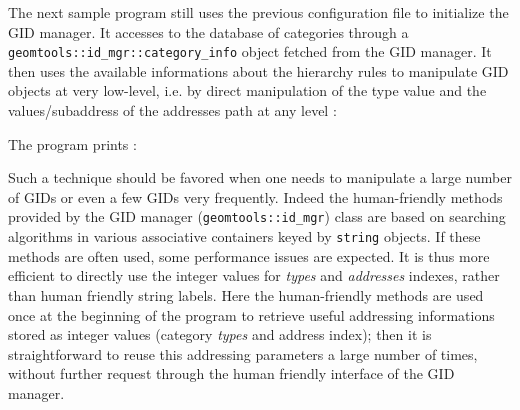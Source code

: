 \pn   The    next   sample    program   still   uses    the   previous
 configuration file to initialize the GID
manager.   It  accesses  to  the  database  of  categories  through  a
\texttt{geomtools::id\_mgr::category\_info}  object  fetched from  the
GID  manager.   It then  uses  the  available  informations about  the
hierarchy rules to manipulate GID  objects at very low-level, i.e.  by
direct manipulation of the type value and the values/subaddress of the
addresses path at  any level :


\pn The program prints :
 
\pn Such a technique should be  favored when one needs to manipulate a
large number of  GIDs or even a few GIDs  very frequently.  Indeed the
human-friendly    methods     provided    by    the     GID    manager
(\texttt{geomtools::id\_mgr}) class are  based on searching algorithms
in various associative containers keyed by \texttt{string} objects. If
these methods are often used, some performance issues are expected. It
is  thus  more  efficient  to  directly use  the  integer  values  for
\emph{types} and \emph{addresses}  indexes, rather than human friendly
string labels.  Here the human-friendly  methods are used once  at the
beginning of  the program  to retrieve useful  addressing informations
stored as  integer values  (category \emph{types} and  address index);
then it is straightforward to reuse this addressing parameters a large
number of  times, without further  request through the  human friendly
interface of the GID manager.


